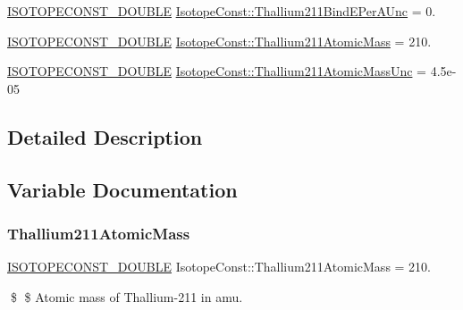 \begin{DoxyCompactItemize}
\mbox{\hyperlink{group___isotope_const-_macros_ga8f45a7272ce02c0b4c65c44636ed719a}{I\+S\+O\+T\+O\+P\+E\+C\+O\+N\+S\+T\+\_\+\+D\+O\+U\+B\+LE}} \mbox{\hyperlink{group___isotope_const-_thallium-_tl211_ga10b2868c63d7b3c18cc2658d596340ed}{Isotope\+Const\+::\+Thallium211\+Bind\+E\+Per\+A\+Unc}} = 0.
\item 
\mbox{\hyperlink{group___isotope_const-_macros_ga8f45a7272ce02c0b4c65c44636ed719a}{I\+S\+O\+T\+O\+P\+E\+C\+O\+N\+S\+T\+\_\+\+D\+O\+U\+B\+LE}} \mbox{\hyperlink{group___isotope_const-_thallium-_tl211_ga47c8722e71e96a5979ccfbb5662819a0}{Isotope\+Const\+::\+Thallium211\+Atomic\+Mass}} = 210.
\item 
\mbox{\hyperlink{group___isotope_const-_macros_ga8f45a7272ce02c0b4c65c44636ed719a}{I\+S\+O\+T\+O\+P\+E\+C\+O\+N\+S\+T\+\_\+\+D\+O\+U\+B\+LE}} \mbox{\hyperlink{group___isotope_const-_thallium-_tl211_ga5d3496dcc750c9fdfa04403870392775}{Isotope\+Const\+::\+Thallium211\+Atomic\+Mass\+Unc}} = 4.\+5e-\/05
\end{DoxyCompactItemize}


\subsection{Detailed Description}


\subsection{Variable Documentation}
\mbox{\label{group___isotope_const-_thallium-_tl211_ga47c8722e71e96a5979ccfbb5662819a0}} 
\subsubsection{\texorpdfstring{Thallium211\+Atomic\+Mass}{Thallium211AtomicMass}}
{\footnotesize\ttfamily \mbox{\hyperlink{group___isotope_const-_macros_ga8f45a7272ce02c0b4c65c44636ed719a}{I\+S\+O\+T\+O\+P\+E\+C\+O\+N\+S\+T\+\_\+\+D\+O\+U\+B\+LE}} Isotope\+Const\+::\+Thallium211\+Atomic\+Mass = 210.}

\$ \$ Atomic mass of Thallium-\/211 in amu. \mbox{\label{group___isotope_const-_thallium-_tl211_ga5d3496dcc750c9fdfa04403870392775}} 
